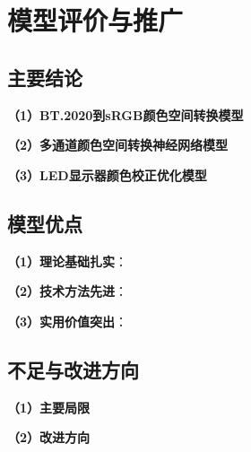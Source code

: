 \chapter[\hspace{0pt}模型评价与推广]{{\heiti{}\hspace{0pt}模型评价与推广}}\label{chapter4: 模型评价与推广}
\removelofgap
\removelotgap

\section[\hspace{-2pt}主要结论]{{\heiti{} \hspace{-8pt}主要结论}}\label{section5: 主要结论}


\noindent\textbf{（1）BT.2020到sRGB颜色空间转换模型}


\noindent\textbf{（2）多通道颜色空间转换神经网络模型}


\noindent\textbf{（3）LED显示器颜色校正优化模型}


\section[\hspace{-2pt}模型优点]{{\heiti{} \hspace{-8pt}模型优点}}\label{section5: 模型优点}

\noindent\textbf{（1）理论基础扎实}：

\noindent\textbf{（2）技术方法先进}：

\noindent\textbf{（3）实用价值突出}：

\section[\hspace{-2pt}不足与改进方向]{{\heiti{} \hspace{-8pt}不足与改进方向}}\label{section5: 不足与改进方向}

\noindent\textbf{（1）主要局限}


\noindent\textbf{（2）改进方向}

